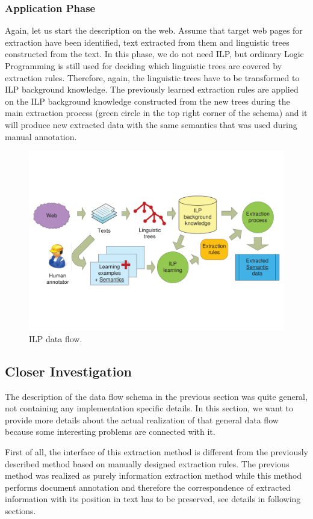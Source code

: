 \subsubsection{Application Phase}
Again, let us start the description on the web. Assume that target web pages for extraction have been identified, text extracted from them and linguistic trees constructed from the text. In this phase, we do not need ILP, but ordinary Logic Programming is still used for deciding which linguistic trees are covered by extraction rules. Therefore, again, the linguistic trees have to be transformed to ILP background knowledge.
 The previously learned extraction rules are applied on the ILP background knowledge constructed from the new trees during the main extraction process (green circle in the top right corner of the schema) and it will produce new extracted data with the same semantics that was used during manual annotation.

\begin{figure}
	\centering
		\includegraphics[angle=-90, width=0.85\hsize]{ILP_data_flow}
	\caption{ILP data flow.}
	\label{fig:ILP_data_flow}
\end{figure}


\subsection{Closer Investigation}
The description of the data flow schema in the previous section was quite general, not containing any implementation specific details. In this section, we want to provide more details about the actual realization of that general data flow because some interesting problems are connected with it.

First of all, the interface of this extraction method is different from the previously described method based on manually designed extraction rules. The previous method was realized as purely information extraction method while this method performs document annotation and therefore the correspondence of extracted information with its position in text has to be preserved, see details in following sections. 


